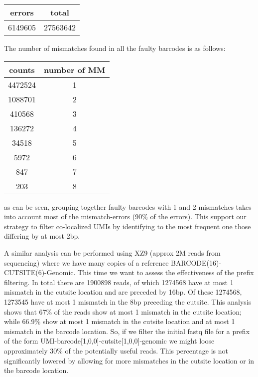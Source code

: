 \documentclass[11pt,a4paper]{article}
\begin{document}
\begin{tabular}{|c|c|}
\hline 
errors & total \\ 
\hline 
6149605 & 27563642 \\ 
\hline 
\end{tabular} 

The number of mismatches found in all the faulty barcodes is as follows:

\begin{tabular}{|c|c|}
\hline 
counts & number of MM \\ 
\hline 
4472524 & 1 \\ 
\hline 
1088701 & 2 \\ 
\hline 
410568 & 3 \\ 
\hline 
136272 & 4 \\ 
\hline 
34518 & 5 \\ 
\hline 
5972 & 6 \\ 
\hline 
847 & 7 \\ 
\hline 
203 & 8 \\ 
\hline 
\end{tabular}

as can be seen, grouping together faulty barcodes with 1 and 2 mismatches takes into account most of the mismatch-errors (90\% of the errors). This support our strategy to filter co-localized UMIs by identifying to the most frequent one those differing by at most 2bp.


A similar analysis can be performed using XZ9 (approx 2M reads from sequencing) where we have many copies of a reference BARCODE(16)-CUTSITE(6)-Genomic. This time we want to assess the effectiveness of the prefix filtering. In total there are 1900898 reads, of which 1274568 have at most 1 mismatch in the cutsite location and are preceded by 16bp. Of these 1274568, 1273545 have at most 1 mismatch in the 8bp 
preceding the cutsite. 
This analysis shows that 67\% of the reads show at most 1 mismatch in the cutsite location; while 66.9\% show at most 1 mismatch in the cutsite location and at most 1 mismatch in the barcode location. So, if we filter the initial fastq file for a prefix of the form UMI-barcode[1,0,0]-cutsite[1,0,0]-genomic we might loose approximately 30\% of the potentially useful reads. This percentage is not significantly lowered by allowing for more mismatches in the cutsite location or in the barcode location. 
\end{document}
